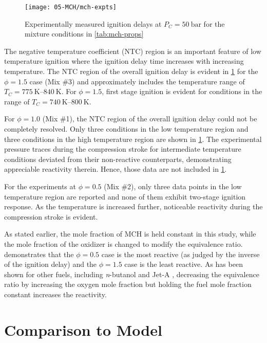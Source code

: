 \documentclass[../main.tex]{subfiles}
\begin{document}
\begin{figure}
    \texttt{[image: 05-MCH/mch-expts]}
    \caption{Experimentally measured ignition delays at $P_C=\SI{50}{\bar}$ for the
    mixture conditions in \cref{tab:mch-props}}
    \label{fig:mch-expts}
\end{figure}

The negative temperature coefficient (NTC) region is an important feature of
low temperature ignition where the ignition delay time increases with
increasing temperature. The NTC region of the overall ignition delay is
evident in \cref{fig:mch-expts} for the $\phi=\num{1.5}$ case (Mix \#3) and
approximately includes the temperature range of $T_C=\SIrange{775}{840}{\kelvin}$. For
$\phi=\num{1.5}$, first stage ignition is evident for conditions in the range of
$T_C=\SIrange{740}{800}{\kelvin}$.

For $\phi=\num{1.0}$ (Mix \#1), the NTC region of the overall ignition delay could
not be completely resolved. Only three conditions in the low temperature region
and three conditions in the high temperature region are shown in
\cref{fig:mch-expts}. The experimental pressure traces during the compression
stroke for intermediate temperature conditions deviated from their
non-reactive counterparts, demonstrating appreciable reactivity therein. Hence,
those data are not included in \cref{fig:mch-expts}.

For the experiments at $\phi=\num{0.5}$ (Mix \#2), only three data points in the low
temperature region are reported and none of them exhibit two-stage ignition
response. As the temperature is increased further, noticeable reactivity during
the compression stroke is evident.

As stated earlier, the mole fraction of MCH is held constant in this study,
while the mole fraction of the oxidizer is changed to modify the equivalence
ratio.  demonstrates that the $\phi=\num{0.5}$ case is the most
reactive (as judged by the inverse of the ignition delay) and the $\phi=\num{1.5}$
case is the least reactive. As has been shown for other fuels, including
\textit{n}-butanol \cite{Weber2011} and Jet-A \cite{Kumar2010}, decreasing the
equivalence ratio by increasing the oxygen mole fraction but holding the fuel
mole fraction constant increases the reactivity.

\section{Comparison to Model}
\label{sec:model-comparison}
\end{document}
